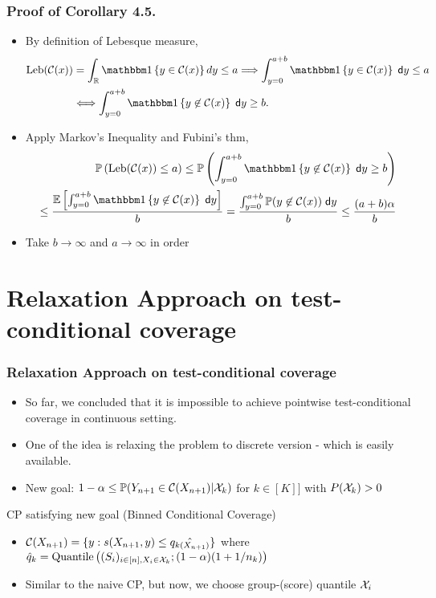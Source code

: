 \documentclass[compress]{beamer}
\begin{document}
\begin{frame}\frametitle{Proof of Corollary 4.5.}
	\begin{itemize}
		\item By definition of Lebesque measure,
		\small
		\begin{align*}
			\textnormal{Leb}(\cC(x)) &= \int_{\mathbb{R}} \ind{y\in\cC(x)} dy\leq a \Longrightarrow \int_{y=0}^{a+b}\ind{y\in\cC(x)}\;\mathsf{d}y\leq a \\
			&\Longleftrightarrow \int_{y=0}^{a+b}\ind{y\not\in\cC(x)}\;\mathsf{d}y\geq b.
		\end{align*}
		\normalsize
		\item Apply Markov's Inequality and Fubini's thm,
		\small
		\begin{align*}
			\P\left(\textnormal{Leb}(\cC(x))\leq a\right) \leq \P\left(\int_{y=0}^{a+b}\ind{y\not\in\cC(x)}\;\mathsf{d}y\geq b\right) \\
			 \leq \frac{\E\left[\int_{y=0}^{a+b}\ind{y\not\in\cC(x)}\;\mathsf{d}y\right]}{b} = \frac{\int_{y=0}^{a+b}\P(y\not\in\cC(x))\;\mathsf{d}y}{b} \leq \frac{(a+b)\alpha}{b}
		\end{align*}
		\normalsize
		\item Take $b\rightarrow \infty$ and $a\rightarrow \infty$ in order
	\end{itemize}
\end{frame}

\section{Relaxation Approach on test-conditional coverage}
\begin{frame}\frametitle{Relaxation Approach on test-conditional coverage}
	\begin{itemize}
		\item So far, we concluded that it is impossible to achieve pointwise test-conditional coverage in continuous setting.
		\item One of the idea is relaxing the problem to discrete version - which is easily available.
		\item New goal:
		$1-\alpha \le \mathbb{P}(Y_{n+1}\in \mathcal{C}(X_{n+1})|\mathcal{X}_k)$ for $k \in [K]]$ with $P(\mathcal{X}_k) > 0$
	\end{itemize}

	\begin{alertblock}{CP satisfying new goal (Binned Conditional Coverage)}
		\begin{itemize}
			\item $\mathcal{C}(X_{n+1}) = \{y : s(X_{n+1}, y)\le \hat{q_{k(X_{n+1})}}\}$ where
				$\hat{q}_k = \mathrm{Quantile}\left((S_i)_{i\in [n], X_i \in \mathcal{X}_k} ; (1-\alpha)(1+1/n_k)\right)$\\
			\item Similar to the naive CP, but now, we choose group-(score) quantile $\mathcal{X}_i$
		\end{itemize}
	\end{alertblock}
\end{frame}
\end{document}
